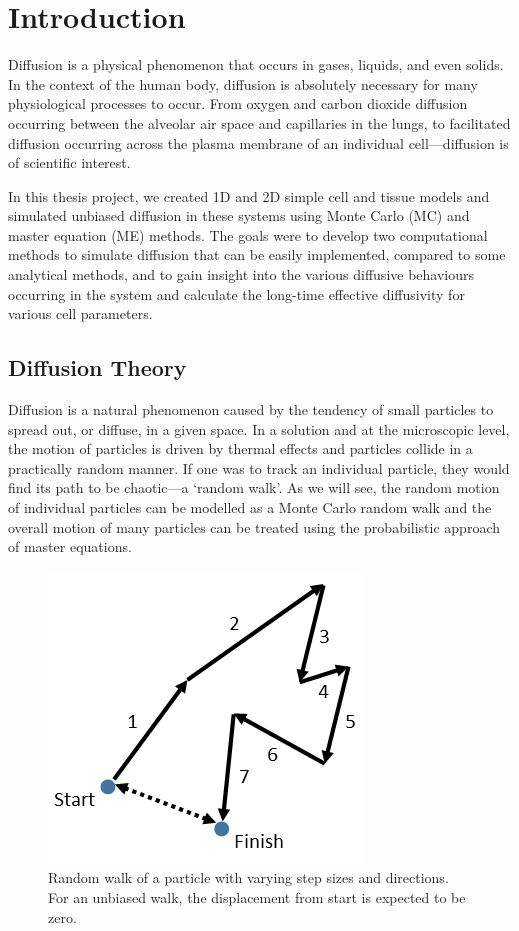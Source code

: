 \chapter{Introduction}
\label{chapter:introduction}

	Diffusion is a physical phenomenon that occurs in gases, liquids, and even solids. In the context of the human body, diffusion is absolutely necessary for many physiological processes to occur. From oxygen and carbon dioxide diffusion occurring between the alveolar air space and capillaries in the lungs, to facilitated diffusion occurring across the plasma membrane of an individual cell---diffusion is of scientific interest.
	
	In this thesis project, we created 1D and 2D simple cell and tissue models and simulated unbiased diffusion in these systems using Monte Carlo (MC) and master equation (ME) methods. The goals were to develop two computational methods to simulate diffusion that can be easily implemented, compared to some analytical methods, and to gain insight into the various diffusive behaviours occurring in the system and calculate the long-time effective diffusivity for various cell parameters.
	
\section{Diffusion Theory}
\label{sec:intro-diffusion}
	Diffusion is a natural phenomenon caused by the tendency of small particles to spread out, or diffuse, in a given space. In a solution and at the microscopic level, the motion of particles is driven by thermal effects and particles collide in a practically random manner. If one was to track an individual particle, they would find its path to be chaotic---a `random walk'. As we will see, the random motion of individual particles can be modelled as a Monte Carlo random walk and the overall motion of many particles can be treated using the probabilistic approach of master equations.
	
	\begin{figure}[h]
		\centering
		\includegraphics[width=0.4\linewidth]{../images/random-walk}
		\caption[Simple random walk]{Random walk of a particle with varying step sizes and directions. For an unbiased walk, the displacement from start is expected to be zero.}
		\label{fig:random-walk}
	\end{figure}
	
